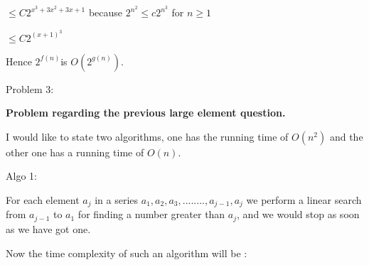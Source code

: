 \documentclass[letterpaper,portrait,12pt]{article}
\begin{document}
\begin{flushleft}
	$\le C 2^{x^3 + 3x^2+3x +1}$ because $2^{n^2} \le c  2^{n^3}$ for $n\ge1$
\end{flushleft}


\begin{flushleft}
	$\le C 2^{(x+1)^3}$
\end{flushleft}


\begin{flushleft}
Hence  $2^{f(n)}$is $O(2^{g(n)})$. 
\end{flushleft}


\begin{flushleft}

\end{flushleft}


\begin{flushleft}
Problem 3:
\end{flushleft}


\begin{flushleft}
\textbf{Problem regarding the previous large element question.}
\end{flushleft}


\begin{flushleft}

\end{flushleft}


\begin{flushleft}
I would like to state two algorithms, one has the running time of $O(n^2)
$ and the other one has a running time of $O(n)
$.
\end{flushleft}


\begin{flushleft}

\end{flushleft}


\begin{flushleft}
Algo 1:
\end{flushleft}


\begin{flushleft}
	For each element $a_j$ in a series  $a_1,a_2,a_3,........,a_{j-1},a_j$ we perform a linear search from $a_{j-1}$ to $a_1$ for finding a number greater than $a_j$, and we would stop as soon as we have got one.
\end{flushleft}


\begin{flushleft}

\end{flushleft}


\begin{flushleft}
Now the time complexity of such an algorithm will be :
\end{flushleft}
\end{document}
